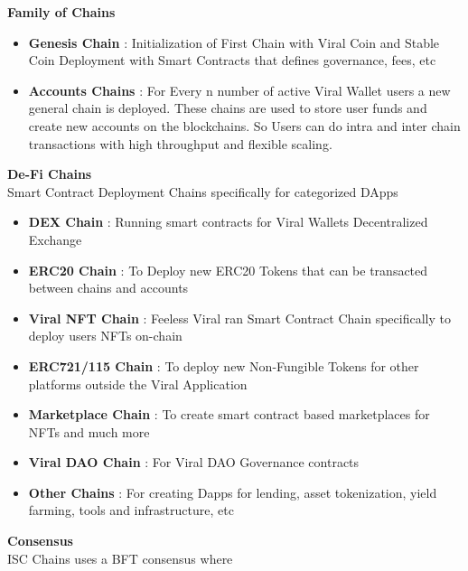 \documentclass[10pt]{article}
\begin{document}
\textbf{Family of Chains}

\begin{itemize}[leftmargin=+0.2in]
\item \textbf{Genesis Chain} : Initialization of First Chain with Viral Coin and Stable Coin Deployment with Smart Contracts that defines governance, fees, etc\\

\item \textbf{Accounts Chains} : For Every n number of active Viral Wallet users a new general chain is deployed. These chains are used to store user funds and create new accounts on the blockchains. So Users can do intra and inter chain transactions with high throughput and flexible scaling.\\
\end{itemize}
\textbf{De-Fi Chains}\\
Smart Contract Deployment Chains specifically for categorized DApps
\begin{itemize}[leftmargin=+0.2in]

\item \textbf{DEX Chain} : Running smart contracts for Viral Wallet\textsc{}s Decentralized Exchange

\item \textbf{ERC20 Chain} : To Deploy new ERC20 Tokens that can be transacted between chains and accounts

\item \textbf{Viral NFT Chain} : Feeless Viral ran Smart Contract Chain specifically to deploy user\textsc{}s NFTs on-chain

\item \textbf{ERC721/115 Chain} : To deploy new Non-Fungible Tokens for other platforms outside the Viral Application

\item \textbf{Marketplace Chain} : To create smart contract based marketplaces for NFTs and much more

\item \textbf{Viral DAO Chain} : For Viral DAO Governance contracts

\item \textbf{Other Chains} : For creating Dapps for lending, asset tokenization, yield farming, tools and infrastructure, etc
\end{itemize}

\textbf{Consensus}\\

ISC Chains uses a BFT consensus where 
\end{document}

